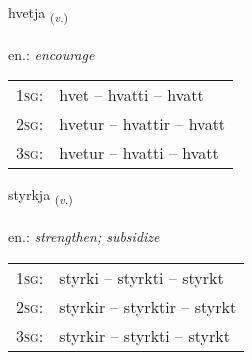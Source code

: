 \documentclass[frontgrid, backgrid]{flacards}\usepackage[]{graphicx}\usepackage[]{xcolor}
\begin{document}
{hvetja \small{\textsubscript{(\textit{v.})}} \\[1ex] %
\textphonetic{[kʰvɛːtja]} \\
en.: \emph{encourage} \\  [2ex]
\renewcommand*{\arraystretch}{0.8}
\begin{tabular}{p{1cm}l}
\textsc{1sg}: & hvet -- hvatti -- hvatt \\ 
\textsc{2sg}: & hvetur -- hvattir -- hvatt \\ 
\textsc{3sg}: & hvetur -- hvatti -- hvatt \\ 
\end{tabular}
}

\renewcommand{\flhead}{\vskip5pt \fboxsep=0pt {\small\bfseries\footnotesize Sagnorð | Verb}}
\renewcommand{\fcfoot}{\vskip5pt \fboxsep=0pt \hspace{2pt}{\small\bfseries\footnotesize 1K}}

\renewcommand{\blhead}{\vskip5pt {\small\bfseries\footnotesize Sagnorð | Verb }}
\renewcommand{\bcfoot}{\vskip5pt \hspace{2pt}{\small\bfseries\footnotesize 1K}}


{styrkja \small{\textsubscript{(\textit{v.})}} \\[1ex] %
\textphonetic{[stɪr̥ca]} \\
en.: \emph{strengthen; subsidize} \\  [2ex]
\renewcommand*{\arraystretch}{0.8}
\begin{tabular}{p{1cm}l}
\textsc{1sg}: & styrki -- styrkti -- styrkt \\ 
\textsc{2sg}: & styrkir -- styrktir -- styrkt \\ 
\textsc{3sg}: & styrkir -- styrkti -- styrkt \\ 
\end{tabular}
}

\renewcommand{\flhead}{\vskip5pt \fboxsep=0pt {\small\bfseries\footnotesize Nafnorð | Noun}}
\renewcommand{\fcfoot}{\vskip5pt \fboxsep=0pt \hspace{2pt}{\small\bfseries\footnotesize 1K}}
\end{document}
